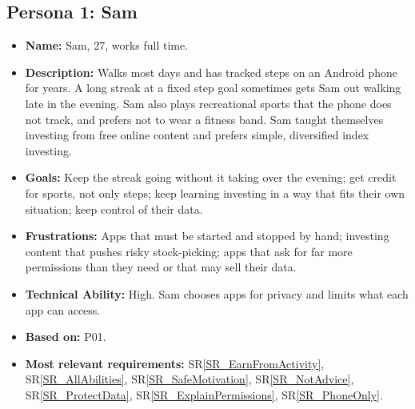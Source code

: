 \documentclass[12pt]{article}
\newcommand{\srref}[1]{SR\ref{#1}}
\begin{document}
\subsection{Persona 1: Sam}
\begin{itemize}
  \item \textbf{Name:} Sam, 27, works full time.
  \item \textbf{Description:} Walks most days and has tracked steps on an
        Android phone for years. A long streak at a fixed step goal sometimes
        gets Sam out walking late in the evening. Sam also plays recreational
        sports that the phone does not track, and prefers not to wear a fitness
        band. Sam taught themselves investing from free online content and
        prefers simple, diversified index investing.
  \item \textbf{Goals:} Keep the streak going without it taking over the
        evening; get credit for sports, not only steps; keep learning investing in a
        way that fits their own situation; keep control of their data.
  \item \textbf{Frustrations:} Apps that must be started and stopped by hand;
        investing content that pushes risky stock-picking; apps that ask for far more
        permissions than they need or that may sell their data.
  \item \textbf{Technical Ability:} High. Sam chooses apps for privacy and
        limits what each app can access.
  \item \textbf{Based on:} P01.
  \item \textbf{Most relevant requirements:} \srref{SR_EarnFromActivity},
        \srref{SR_AllAbilities}, \srref{SR_SafeMotivation}, \srref{SR_NotAdvice},
        \srref{SR_ProtectData}, \srref{SR_ExplainPermissions}, \srref{SR_PhoneOnly}.
\end{itemize}
\end{document}
